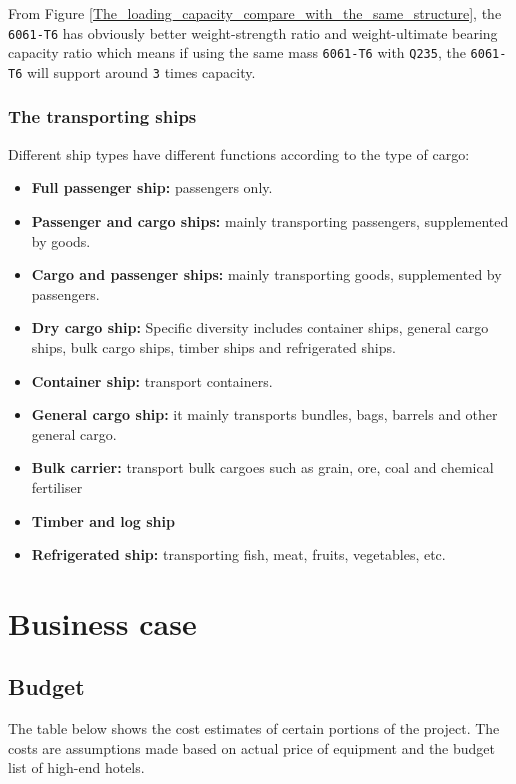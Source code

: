 \documentclass[11pt]{article}
\numberwithin{equation}{section}
\begin{document}
From Figure \ref{The_loading_capacity_compare_with_the_same_structure}, the \texttt{6061-T6} has obviously better weight-strength ratio and weight-ultimate bearing capacity  ratio which means if using the same mass \texttt{6061-T6} with \texttt{Q235}, the \texttt{6061-T6} will support around \texttt{3} times capacity.

\subsubsection{The transporting ships}
\label{sec:org7c6f437}
Different ship types have different functions according to the type of cargo:

\begin{itemize}
\item \textbf{Full passenger ship:} passengers only.
\item \textbf{Passenger and cargo ships:} mainly transporting passengers, supplemented by goods.
\item \textbf{Cargo and passenger ships:} mainly transporting goods, supplemented by passengers.
\item \textbf{Dry cargo ship:} Specific diversity includes container ships, general cargo ships, bulk cargo ships, timber ships and refrigerated ships.
\item \textbf{Container ship:} transport containers.
\item \textbf{General cargo ship:} it mainly transports bundles, bags, barrels and other general cargo.
\item \textbf{Bulk carrier:} transport bulk cargoes such as grain, ore, coal and chemical fertiliser
\item \textbf{Timber and log ship}
\item \textbf{Refrigerated ship:} transporting fish, meat, fruits, vegetables, etc.
\end{itemize}

\section{Business case}
\label{sec:org4605b2e}
\subsection{Budget}
\label{sec:orgf6e1afd}
The table below shows the cost estimates of certain portions of the project. The costs are assumptions made based on actual price of equipment and the budget  list of high-end hotels.
\end{document}

